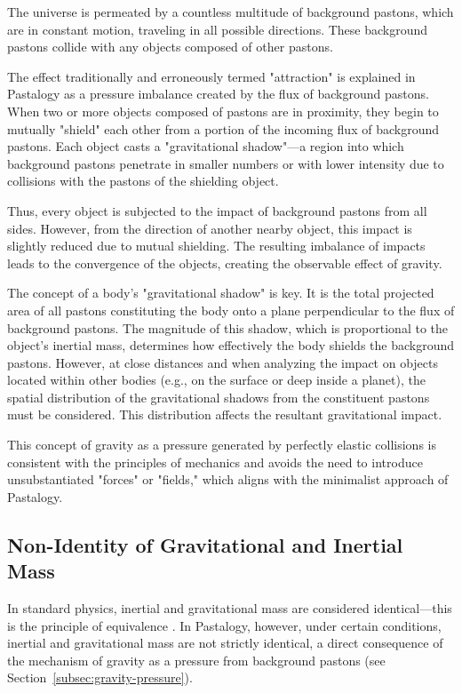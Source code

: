 \documentclass[pdflatex,sn-mathphys-num,referee]{sn-jnl}
\begin{document}
The universe is permeated by a countless multitude of background pastons, which are in constant motion, traveling in all possible directions. These background pastons collide with any objects composed of other pastons.

The effect traditionally and erroneously termed "attraction" is explained in Pastalogy as a pressure imbalance created by the flux of background pastons. When two or more objects composed of pastons are in proximity, they begin to mutually "shield" each other from a portion of the incoming flux of background pastons. Each object casts a "gravitational shadow"---a region into which background pastons penetrate in smaller numbers or with lower intensity due to collisions with the pastons of the shielding object.

Thus, every object is subjected to the impact of background pastons from all sides. However, from the direction of another nearby object, this impact is slightly reduced due to mutual shielding. The resulting imbalance of impacts leads to the convergence of the objects, creating the observable effect of gravity.

The concept of a body's "gravitational shadow" is key. It is the total projected area of all pastons constituting the body onto a plane perpendicular to the flux of background pastons. The magnitude of this shadow, which is proportional to the object's inertial mass, determines how effectively the body shields the background pastons. However, at close distances and when analyzing the impact on objects located within other bodies (e.g., on the surface or deep inside a planet), the spatial distribution of the gravitational shadows from the constituent pastons must be considered. This distribution affects the resultant gravitational impact.

This concept of gravity as a pressure generated by perfectly elastic collisions is consistent with the principles of mechanics and avoids the need to introduce unsubstantiated "forces" or "fields," which aligns with the minimalist approach of Pastalogy.

\subsection{Non-Identity of Gravitational and Inertial Mass}\label{subsec:mass-nonequivalence}

In standard physics, inertial and gravitational mass are considered identical---this is the principle of equivalence \cite{einstein1920-relativity}. In Pastalogy, however, under certain conditions, inertial and gravitational mass are not strictly identical, a direct consequence of the mechanism of gravity as a pressure from background pastons (see Section~\ref{subsec:gravity-pressure}).
\end{document}
